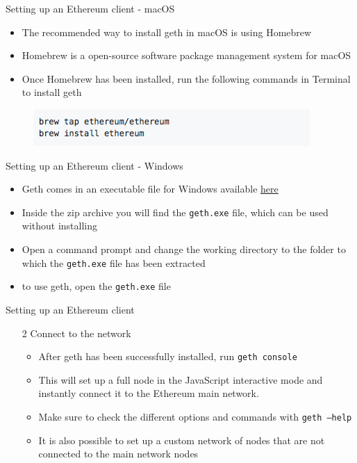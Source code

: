 \documentclass[11pt]{beamer}
\begin{document}

\begin{frame}{Setting up an Ethereum client - macOS}
	\begin{itemize}
		\item The recommended way to install geth in macOS is using Homebrew
		\item Homebrew is a open-source software package management system for macOS
		\item Once Homebrew has been installed, run the following commands in Terminal to install geth
	\end{itemize}
	\begin{figure}[]
		\centering
		\includegraphics  [scale=0.5]{Images/geth3}
	\end{figure}
\end{frame}


\begin{frame}{Setting up an Ethereum client - Windows}
	\begin{itemize}
		\item Geth comes in an executable file for Windows available \href{https://geth.ethereum.org/downloads/}{here}
		\item Inside the zip archive you will find the \texttt{geth.exe} file, which can be used without installing
		\item Open a command prompt and change the working directory to the folder to which the \texttt{geth.exe} file has been extracted
		\item to use geth, open the \texttt{geth.exe} file
	\end{itemize}
\end{frame}


\begin{frame}{Setting up an Ethereum client}
	\begin{enumerate}
		\item[2] Connect to the network
		\begin{itemize}
			\item After geth has been successfully installed, run \texttt{geth console}
			\item This will set up a full node in the JavaScript interactive mode and instantly connect it to the Ethereum main network.
			\item Make sure to check the different options and commands with \texttt{geth ---help}
			\item It is also possible to set up a custom network of nodes that are not connected to the main network nodes
		\end{itemize}
	\end{enumerate}
\end{frame}
\end{document}
